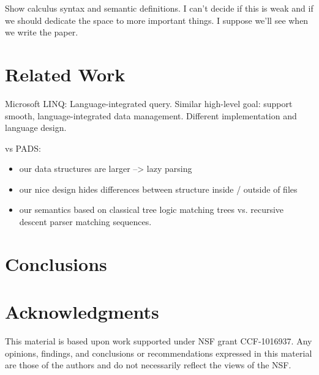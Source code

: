 \documentclass[natbib]{sigplanconf}
\begin{document}
Show calculus syntax and semantic definitions.  I can't decide if this
is weak and if we should dedicate the space to more important things.
I suppose we'll see when we write the paper.

\section{Related Work}
\label{sec:related}

Microsoft LINQ: Language-integrated query.  Similar high-level goal:
support smooth, language-integrated data management.  Different 
implementation and language design.

vs PADS:  
\begin{itemize}
\item our data structures are larger --> lazy parsing
\item our nice design hides differences between structure inside /
outside of files
\item our semantics based on classical tree logic matching trees vs. 
recursive descent parser matching sequences.
\end{itemize}

\section{Conclusions}
\label{sec:conclusion}


\section*{Acknowledgments}

This material is based upon work 
supported under NSF grant CCF-1016937.
Any opinions, findings, and conclusions or recommendations
   expressed in this material are those of the authors and do not
   necessarily reflect the views of the NSF.


%



%
\end{document}
